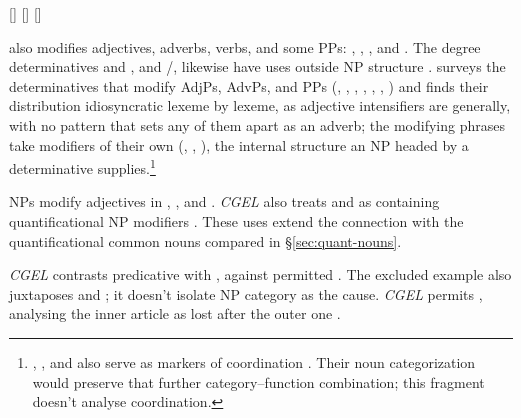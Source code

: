 \documentclass[12pt]{article}
\begin{document}
\ea\label{ex:temporal-adjp}
\ea {} [] 
\ex {} []  [] 
\z\z

 also modifies adjectives, adverbs, verbs, and some PPs: , , , and  \citep[396--397]{huddleston2002}. The degree determinatives  and , and /, likewise have uses outside NP structure \citep[390, 395--397]{huddleston2002}. \textcite{reynolds2024why} surveys the determinatives that modify AdjPs, AdvPs, and PPs (, , , , , , ) and finds their distribution idiosyncratic lexeme by lexeme, as adjective intensifiers are generally, with no pattern that sets any of them apart as an adverb; the modifying phrases take modifiers of their own (, , ), the internal structure an NP headed by a determinative supplies.\footnote{, , and  also serve as markers of coordination \citep[1305, 1308]{huddleston2002}. Their noun categorization would preserve that further category--function combination; this fragment doesn't analyse coordination.}

NPs modify adjectives in , , and . \textit{CGEL} also treats  and  as containing quantificational NP modifiers \citep[549--550]{huddleston2002}. These uses extend the connection with the quantificational common nouns compared in §\ref{sec:quant-nouns}.

\textit{CGEL} contrasts predicative  with , against permitted  \citep[551--552]{huddleston2002}. The excluded example also juxtaposes  and ; it doesn't isolate NP category as the cause. \textit{CGEL} permits , analysing the inner article as lost after the outer one \citep[p.~552, n.~8]{huddleston2002}.
\end{document}

